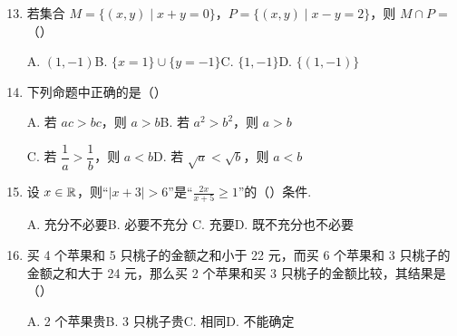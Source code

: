 \documentclass[a4paper,11pt]{article}
\begin{document}
\begin{enumerate}
\end{enumerate}


\begin{enumerate}
\setcounter{enumi}{12}

\item 若集合 $M=\{(x,y)\mid x+y=0\}$，$P=\{(x,y)\mid x-y=2\}$，则 $M\cap P=$\mbox{（\quad）}

\keepwithprev
A. $(1,-1)$\qquad B. $\{x=1\}\cup\{y=-1\}$\qquad C. $\{1,-1\}$\qquad D. $\{(1,-1)\}$

\ifanswer
\solbegin
{}
\solend
\fi

\item 下列命题中正确的是\mbox{（\quad）}

\keepwithprev
A. 若 $ac>bc$，则 $a>b$\qquad\qquad B. 若 $a^2>b^2$，则 $a>b$

C. 若 $\dfrac1a>\dfrac1b$，则 $a<b$\qquad\qquad D. 若 $\sqrt a<\sqrt b$，则 $a<b$

\ifanswer
\solbegin
{}
\solend
\fi

\item 设 $x\in\mathbb{R}$，则“$\lvert x+3\rvert>6$”是“$\frac{2x}{x+5}\geqslant1$”的\mbox{（\quad）}条件.

\keepwithprev
A. 充分不必要\qquad\qquad B. 必要不充分\newline
C. 充要\qquad\qquad\qquad D. 既不充分也不必要

\ifanswer
\solbegin
{}
\solend
\fi

\item 买 4 个苹果和 5 只桃子的金额之和小于 22 元，而买 6 个苹果和 3 只桃子的金额之和大于 24 元，那么买 2 个苹果和买 3 只桃子的金额比较，其结果是\mbox{（\quad）}

\keepwithprev
A. 2 个苹果贵\qquad B. 3 只桃子贵\qquad C. 相同\qquad D. 不能确定

\ifanswer
\solbegin
{}
\solend
\fi

\end{enumerate}
\end{document}
